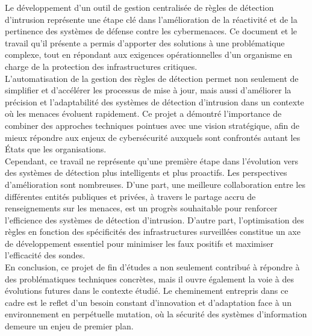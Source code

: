 %
%

Le développement d’un outil de gestion centralisée de règles de détection d’intrusion représente une étape clé dans l'amélioration de la réactivité et de la pertinence des systèmes de défense contre les cybermenaces. Ce document et le travail qu'il présente a permis d’apporter des solutions à une problématique complexe, tout en répondant aux exigences opérationnelles d’un organisme en charge de la protection des infrastructures critiques.\\

L'automatisation de la gestion des règles de détection permet non seulement de simplifier et d'accélérer les processus de mise à jour, mais aussi d’améliorer la précision et l’adaptabilité des systèmes de détection d’intrusion dans un contexte où les menaces évoluent rapidement. Ce projet a démontré l’importance de combiner des approches techniques pointues avec une vision stratégique, afin de mieux répondre aux enjeux de cybersécurité auxquels sont confrontés autant les États que les organisations.\\

Cependant, ce travail ne représente qu’une première étape dans l’évolution vers des systèmes de détection plus intelligents et plus proactifs. Les perspectives d’amélioration sont nombreuses. D’une part, une meilleure collaboration entre les différentes entités publiques et privées, à travers le partage accru de renseignements sur les menaces, est un progrès souhaitable pour renforcer l’efficience des systèmes de détection d'intrusion. D’autre part, l'optimisation des règles en fonction des spécificités des infrastructures surveillées constitue un axe de développement essentiel pour minimiser les faux positifs et maximiser l’efficacité des sondes.\\

En conclusion, ce projet de fin d’études a non seulement contribué à répondre à des problématiques techniques concrètes, mais il ouvre également la voie à des évolutions futures dans le contexte étudié. Le cheminement entrepris dans ce cadre est le reflet d’un besoin constant d’innovation et d’adaptation face à un environnement en perpétuelle mutation, où la sécurité des systèmes d’information demeure un enjeu de premier plan.\\
